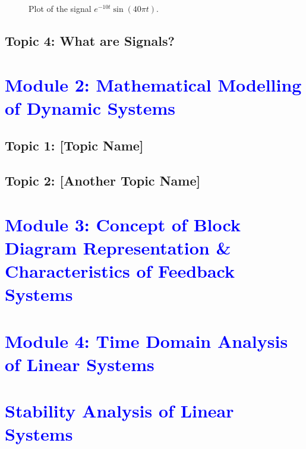 \documentclass[12pt]{report}
\begin{document}
\begin{figure}[H]
    \centering
    \caption{Plot of the signal \(e^{-10t}\sin(40\pi t)\).}\label{fig:exp-damped-sinusoid-plot-1}
\end{figure}

\section{Topic 4: What are Signals?}

\clearpage

\chapter{\textcolor{blue}{Module 2: Mathematical Modelling of Dynamic Systems}}

\section{Topic 1: [Topic Name]}

\section{Topic 2: [Another Topic Name]}

\clearpage

\chapter{\textcolor{blue}{Module 3: Concept of Block Diagram Representation \& Characteristics of Feedback Systems}}

\clearpage

\chapter{\textcolor{blue}{Module 4: Time Domain Analysis of Linear Systems}}
\clearpage

\chapter{\textcolor{blue}{Stability Analysis of Linear Systems}}
\end{document}
